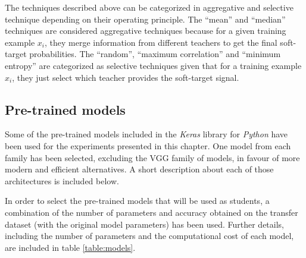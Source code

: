  The techniques described above can be categorized in aggregative and selective technique depending on their operating principle. The ``mean'' and ``median'' techniques are considered aggregative techniques because for a given training example $x_i$, they merge information from different teachers to get the final soft-target probabilities. The ``random'', ``maximum correlation'' and ``minimum entropy'' are categorized as selective techniques given that for a training example $x_i$, they just select which teacher provides the soft-target signal.  

 \subsection{Pre-trained models}
 Some of the pre-trained models included in the \textit{Keras} library for \textit{Python} \autocite{chollet2015keras} have been used for the experiments presented in this chapter. One model from each family has been selected, excluding the VGG family of models, in favour of more modern and efficient alternatives. A short description about each of those architectures is included below.
 
  In order to select the pre-trained models that will be used as students, a combination of the number of parameters and accuracy obtained on the transfer dataset (with the original model parameters) has been used. Further details, including the number of parameters and the computational cost of each model, are included in table \ref{table:models}.


